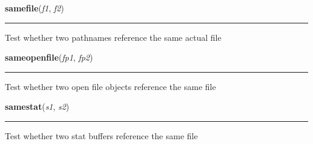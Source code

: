     \label{posixpath:samefile}

    \vspace{0.5ex}

\hspace{.8\funcindent}\begin{boxedminipage}{\funcwidth}

    \raggedright \textbf{samefile}(\textit{f1}, \textit{f2})

    \vspace{-1.5ex}

    \rule{\textwidth}{0.5\fboxrule}
\setlength{\parskip}{2ex}
    Test whether two pathnames reference the same actual file

\setlength{\parskip}{1ex}
    \end{boxedminipage}

    \label{posixpath:sameopenfile}

    \vspace{0.5ex}

\hspace{.8\funcindent}\begin{boxedminipage}{\funcwidth}

    \raggedright \textbf{sameopenfile}(\textit{fp1}, \textit{fp2})

    \vspace{-1.5ex}

    \rule{\textwidth}{0.5\fboxrule}
\setlength{\parskip}{2ex}
    Test whether two open file objects reference the same file

\setlength{\parskip}{1ex}
    \end{boxedminipage}

    \label{posixpath:samestat}

    \vspace{0.5ex}

\hspace{.8\funcindent}\begin{boxedminipage}{\funcwidth}

    \raggedright \textbf{samestat}(\textit{s1}, \textit{s2})

    \vspace{-1.5ex}

    \rule{\textwidth}{0.5\fboxrule}
\setlength{\parskip}{2ex}
    Test whether two stat buffers reference the same file

\setlength{\parskip}{1ex}
    \end{boxedminipage}

